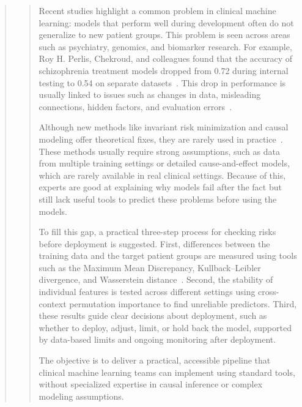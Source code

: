 \begin{abstract}
\begin{abstract}
Recent studies highlight a common problem in clinical machine learning: models that perform well during development often do not generalize to new patient groups. This problem is seen across areas such as psychiatry, genomics, and biomarker research. For example, Roy H. Perlis, Chekroud, and colleagues found that the accuracy of schizophrenia treatment models dropped from 0.72 during internal testing to 0.54 on separate datasets~\cite{chekroud2024illusory}. This drop in performance is usually linked to issues such as changes in data, misleading connections, hidden factors, and evaluation errors~\cite{whalen2022pitfalls, bendavid2010theory}.

Although new methods like invariant risk minimization and causal modeling offer theoretical fixes, they are rarely used in practice~\cite{arjovsky2019irm, pavlovic2024improving}. These methods usually require strong assumptions, such as data from multiple training settings or detailed cause-and-effect models, which are rarely available in real clinical settings. Because of this, experts are good at explaining why models fail after the fact but still lack useful tools to predict these problems before using the models.

To fill this gap, a practical three-step process for checking risks before deployment is suggested. First, differences between the training data and the target patient groups are measured using tools such as the Maximum Mean Discrepancy, Kullback--Leibler divergence, and Wasserstein distance~\cite{gretton2012kernel, duchi2018learning, rahimian2019dro}. Second, the stability of individual features is tested across different settings using cross-context permutation importance to find unreliable predictors. Third, these results guide clear decisions about deployment, such as whether to deploy, adjust, limit, or hold back the model, supported by data-based limits and ongoing monitoring after deployment.

The objective is to deliver a practical, accessible pipeline that clinical machine learning teams can implement using standard tools, without specialized expertise in causal inference or complex modeling assumptions.
\end{abstract}
\end{abstract}